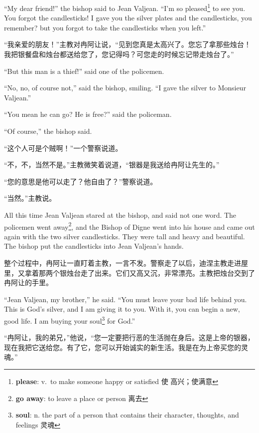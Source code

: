 \documentclass[fontset=ubuntu, zihao=5]{ctexart}
\begin{document}
\begin{paracol}{2}
  \switchcolumn*

  ``My dear friend!'' the bishop said to Jean Valjean. ``I'm so
  pleased\footnote{\textbf{please}: v. to make someone happy or satisfied 使
    高兴；使满意} to see you. You forgot the candlesticks! I gave you the
  silver plates and the candlesticks, you remember? but you forgot to take
  the candlesticks when you left.''

  \switchcolumn
  “我亲爱的朋友！”主教对冉阿让说，“见到您真是太高兴了。您忘了拿那些烛台！我把银餐盘和烛台都送给您了，您记得吗？可您走的时候忘记带走烛台了。”

  \switchcolumn*

  ``But this man is a thief!'' said one of the policemen.

  ``No, no, of course not,'' said the bishop, smiling. ``I gave the silver to Monsieur Valjean.''

  ``You mean he can go? He is free?'' said the policeman.

  ``Of course,'' the bishop said.

  \switchcolumn

  “这个人可是个贼啊！”一个警察说道。

  “不，不，当然不是。”主教微笑着说道，“银器是我送给冉阿让先生的。”

  “您的意思是他可以走了？他自由了？”警察说道。

  “当然。”主教说。

  \switchcolumn*

  All this time Jean Valjean stared at the bishop, and said not one word. The policemen went away\footnote{\textbf{go away}: to leave a place or person 离去}, and the Bishop of Digne went into his house and came out again with the two silver candlesticks. They were tall and heavy and beautiful. The bishop put the candlesticks into Jean Valjean's hands.

  \switchcolumn
  整个过程中，冉阿让一直盯着主教，一言不发。警察走了以后，迪涅主教走进屋里，又拿着那两个银烛台走了出来。它们又高又沉，非常漂亮。主教把烛台交到了冉阿让的手里。

  \switchcolumn*

  ``Jean Valjean, my brother,'' he said. ``You must leave your bad life behind you. This is God's silver, and I am giving it to you. With it, you can begin a new, good life. I am buying your soul\footnote{\textbf{soul}: n. the part of a person that contains their character, thoughts, and feelings 灵魂} for God.''

  \switchcolumn
  “冉阿让，我的弟兄，”他说，“您一定要把行恶的生活抛在身后。这是上帝的银器，现在我把它送给您。有了它，您可以开始诚实的新生活。我是在为上帝买您的灵魂。”


\end{paracol}
\end{document}

